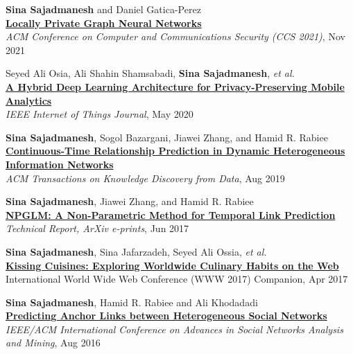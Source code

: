 \documentclass[8pt]{article}
\begin{document}
\begin{bibenum}
	\item{} \textbf{Sina Sajadmanesh} and Daniel Gatica-Perez\\
	\href{https://arxiv.org/abs/2006.05535}{\textbf{Locally Private Graph Neural Networks}}\\
	\textit{ACM Conference on Computer and Communications Security (CCS 2021)}, Nov 2021

	\item{} Seyed Ali Osia, Ali Shahin Shamsabadi, \textbf{Sina Sajadmanesh}, \textit{et al.}\\
	\href{https://arxiv.org/abs/1703.02952}{\textbf{A Hybrid Deep Learning Architecture for Privacy-Preserving Mobile Analytics}}\\
	\textit{IEEE Internet of Things Journal}, May 2020
	
	\item{} \textbf{Sina Sajadmanesh}, Sogol Bazargani, Jiawei Zhang, and Hamid R. Rabiee\\
	\href{https://arxiv.org/abs/1710.00818}{\textbf{Continuous-Time Relationship Prediction in Dynamic Heterogeneous Information Networks}}\\
	\textit{ACM Transactions on Knowledge Discovery from Data}, Aug 2019
	
	\item{} \textbf{Sina Sajadmanesh}, Jiawei Zhang, and Hamid R. Rabiee\\
	\href{https://arxiv.org/abs/1706.06783}{\textbf{NPGLM: A Non-Parametric Method for Temporal Link Prediction}}\\
	\textit{Technical Report, ArXiv e-prints}, Jun 2017
	
	\item{} \textbf{Sina Sajadmanesh}, Sina Jafarzadeh, Seyed Ali Ossia, \textit{et al.}\\
	\href{https://arxiv.org/pdf/1610.08469}{\textbf{Kissing Cuisines: Exploring Worldwide Culinary Habits on the Web}}\\
	International World Wide Web Conference (WWW 2017) Companion, Apr 2017
	
	\item{} \textbf{Sina Sajadmanesh}, Hamid R. Rabiee and Ali Khodadadi\\
	\href{https://arxiv.org/pdf/1607.08821}{\textbf{Predicting Anchor Links between Heterogeneous Social Networks}}\\
	\textit{IEEE/ACM International Conference on Advances in Social Networks Analysis and Mining},  Aug 2016
	
\end{bibenum}
\end{document}
